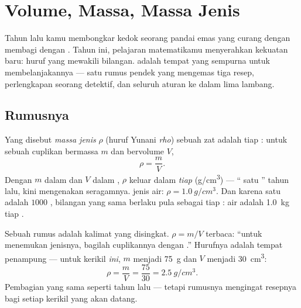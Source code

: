 \chapter{Volume, Massa, Massa Jenis}\label{ch:g7:volume-mass-density}

Tahun lalu kamu membongkar kedok seorang pandai emas yang curang
dengan membagi  dengan . Tahun ini, pelajaran
matematikamu menyerahkan kekuatan baru: huruf yang mewakili bilangan.
 adalah tempat yang sempurna untuk membelanjakannya --- satu
rumus pendek yang mengemas tiga resep, perlengkapan seorang detektif,
dan seluruh aturan  ke dalam lima lambang.

\section{Rumusnya}

\begin{definition}\label{def:g7:volume-mass-density:formula}
Yang disebut \emph{massa jenis} $\rho$ (huruf Yunani
\emph{rho}) sebuah zat adalah  tiap  : untuk
sebuah cuplikan bermassa $m$ dan bervolume $V$,
\[
\rho = \frac{m}{V}.
\]
Dengan $m$ dalam  dan $V$ dalam , $\rho$ keluar
dalam \emph{ tiap } (\unit{g/cm^3}) --- ``
satu '' tahun lalu, kini mengenakan seragamnya. 
jenis air: $\rho = \qty{1.0}{g/cm^3}$. Dan karena satu  adalah
$1000$ , bilangan yang sama berlaku pula sebagai
 tiap : air adalah \qty{1.0}{kg} tiap .
\end{definition}

\begin{example}\label{ex:g7:volume-mass-density:reading}
Sebuah rumus adalah kalimat yang disingkat. $\rho = m/V$ terbaca:
``untuk menemukan  jenisnya, bagilah  cuplikannya dengan
.'' Hurufnya adalah tempat penampung --- untuk kerikil
\emph{ini}, $m$ menjadi
\qty{75}{g} dan $V$ menjadi \qty{30}{cm^3}:
\[
\rho = \frac{m}{V} = \frac{75}{30} = \qty{2.5}{g/cm^3}.
\]
Pembagian yang sama seperti tahun lalu --- tetapi rumusnya mengingat
resepnya bagi setiap kerikil yang akan datang.
\end{example}

